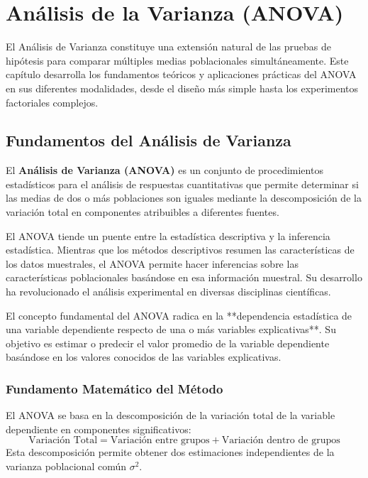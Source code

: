 \chapter{Análisis de la Varianza (ANOVA)}

El Análisis de Varianza constituye una extensión natural de las pruebas de hipótesis para comparar múltiples medias poblacionales simultáneamente. Este capítulo desarrolla los fundamentos teóricos y aplicaciones prácticas del ANOVA en sus diferentes modalidades, desde el diseño más simple hasta los experimentos factoriales complejos.

\section{Fundamentos del Análisis de Varianza}

\begin{definition}
El \textbf{Análisis de Varianza (ANOVA)} es un conjunto de procedimientos estadísticos para el análisis de respuestas cuantitativas que permite determinar si las medias de dos o más poblaciones son iguales mediante la descomposición de la variación total en componentes atribuibles a diferentes fuentes.
\end{definition}

\begin{remark}
El ANOVA tiende un puente entre la estadística descriptiva y la inferencia estadística. Mientras que los métodos descriptivos resumen las características de los datos muestrales, el ANOVA permite hacer inferencias sobre las características poblacionales basándose en esa información muestral. Su desarrollo ha revolucionado el análisis experimental en diversas disciplinas científicas.
\end{remark}

El concepto fundamental del ANOVA radica en la **dependencia estadística de una variable dependiente respecto de una o más variables explicativas**. Su objetivo es estimar o predecir el valor promedio de la variable dependiente basándose en los valores conocidos de las variables explicativas.

\subsection{Fundamento Matemático del Método}

\begin{theorem}
El ANOVA se basa en la descomposición de la variación total de la variable dependiente en componentes significativos:
\[
\text{Variación Total} = \text{Variación entre grupos} + \text{Variación dentro de grupos}
\]
Esta descomposición permite obtener dos estimaciones independientes de la varianza poblacional común $\sigma^2$.
\end{theorem}

